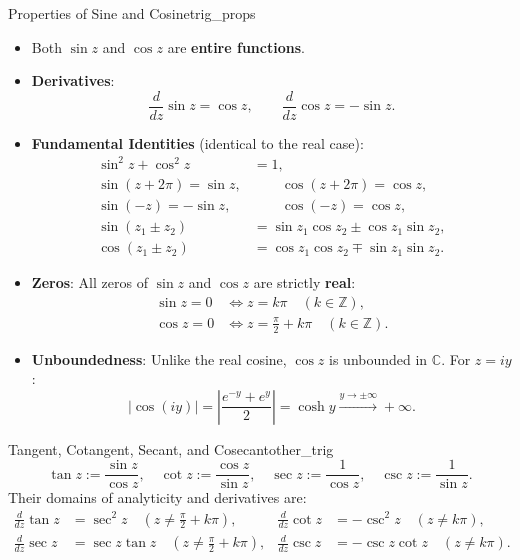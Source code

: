 \begin{proposition}{Properties of Sine and Cosine}{trig_props}
\begin{itemize}
    \item Both $\sin z$ and $\cos z$ are \textbf{entire functions}.
    \item \textbf{Derivatives}:
    \begin{equation}
    \frac{d}{dz} \sin z = \cos z, \qquad \frac{d}{dz} \cos z = -\sin z.
    \end{equation}
    \item \textbf{Fundamental Identities} (identical to the real case):
    \begin{align}
    \sin^2 z + \cos^2 z &= 1, \\
    \sin(z + 2\pi) = \sin z, &\qquad \cos(z + 2\pi) = \cos z, \\
    \sin(-z) = -\sin z, &\qquad \cos(-z) = \cos z, \\
    \sin(z_1 \pm z_2) &= \sin z_1 \cos z_2 \pm \cos z_1 \sin z_2, \\
    \cos(z_1 \pm z_2) &= \cos z_1 \cos z_2 \mp \sin z_1 \sin z_2.
    \end{align}
    \item \textbf{Zeros}: All zeros of $\sin z$ and $\cos z$ are strictly \textbf{real}:
    \begin{align}
    \sin z = 0 &\iff z = k\pi \quad (k \in \mathbb{Z}), \\
    \cos z = 0 &\iff z = \frac{\pi}{2} + k\pi \quad (k \in \mathbb{Z}).
    \end{align}
    \item \textbf{Unboundedness}: Unlike the real cosine, $\cos z$ is unbounded in $\mathbb{C}$. For $z = iy$:
    \begin{equation}
    |\cos(iy)| = \left|\frac{e^{-y} + e^y}{2}\right| = \cosh y \xrightarrow{y \to \pm\infty} +\infty.
    \end{equation}
\end{itemize}
\end{proposition}

\begin{definition}{Tangent, Cotangent, Secant, and Cosecant}{other_trig}
\begin{equation}
\tan z := \frac{\sin z}{\cos z}, \quad \cot z := \frac{\cos z}{\sin z}, \quad \sec z := \frac{1}{\cos z}, \quad \csc z := \frac{1}{\sin z}.
\end{equation}
Their domains of analyticity and derivatives are:
\begin{align}
\frac{d}{dz}\tan z &= \sec^2 z \quad \left(z \neq \frac{\pi}{2} + k\pi\right), & \frac{d}{dz}\cot z &= -\csc^2 z \quad (z \neq k\pi), \\
\frac{d}{dz}\sec z &= \sec z \tan z \quad \left(z \neq \frac{\pi}{2} + k\pi\right), & \frac{d}{dz}\csc z &= -\csc z \cot z \quad (z \neq k\pi).
\end{align}
\end{definition}

